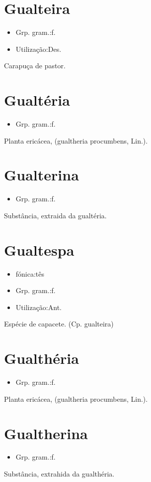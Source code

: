 \section{Gualteira}
\begin{itemize}
\item {Grp. gram.:f.}
\end{itemize}
\begin{itemize}
\item {Utilização:Des.}
\end{itemize}
Carapuça de pastor.
\section{Gualtéria}
\begin{itemize}
\item {Grp. gram.:f.}
\end{itemize}
Planta ericácea, (\textunderscore gualtheria procumbens\textunderscore , Lin.).
\section{Gualterina}
\begin{itemize}
\item {Grp. gram.:f.}
\end{itemize}
Substância, extraida da gualtéria.
\section{Gualtespa}
\begin{itemize}
\item {fónica:tês}
\end{itemize}
\begin{itemize}
\item {Grp. gram.:f.}
\end{itemize}
\begin{itemize}
\item {Utilização:Ant.}
\end{itemize}
Espécie de capacete.
(Cp. \textunderscore gualteira\textunderscore )
\section{Gualthéria}
\begin{itemize}
\item {Grp. gram.:f.}
\end{itemize}
Planta ericácea, (\textunderscore gualtheria procumbens\textunderscore , Lin.).
\section{Gualtherina}
\begin{itemize}
\item {Grp. gram.:f.}
\end{itemize}
Substância, extrahida da gualthéria.
